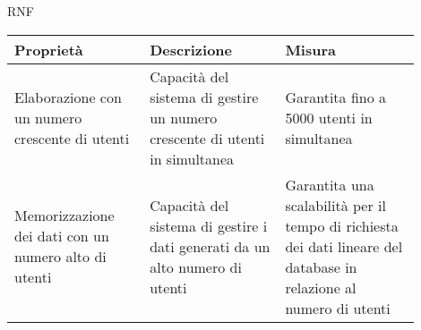 \begin{listaPersonale}{RNF}
    \begin{tabular}{|p{0.3\linewidth}|p{0.3\linewidth}|p{0.3\linewidth}|}
        \hline
        \rowcolor{viola} \textbf{Proprietà}                                         &
        \textbf{Descrizione}                                                        &
        \textbf{Misura}                                                                                                    \\
        \hline
        Elaborazione con un numero crescente di utenti                              &
        Capacità del sistema di gestire un numero crescente di utenti in simultanea &
        Garantita fino a 5000 utenti in simultanea                                                                         \\
        \hline
        Memorizzazione dei dati con un numero alto di utenti                        &
        Capacità del sistema di gestire i dati generati da un alto numero di utenti &
        Garantita una scalabilità per il tempo di richiesta dei dati lineare del database in relazione al numero di utenti \\
        \hline
    \end{tabular}


\end{listaPersonale}
